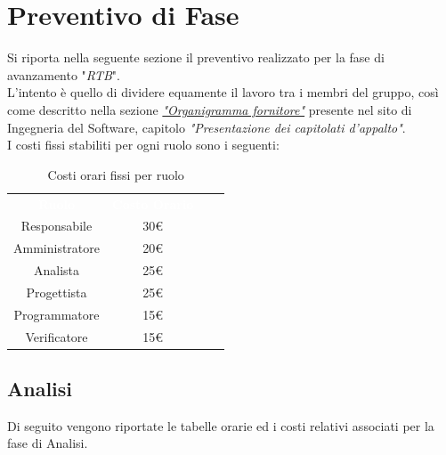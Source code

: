 \section{Preventivo di Fase}
Si riporta nella seguente sezione il preventivo realizzato per la fase
di avanzamento "\textit{RTB}".\\
L'intento è quello di dividere equamente il lavoro tra i membri del gruppo,
così come descritto nella sezione \href{https://www.math.unipd.it/~tullio/IS-1/2021/Progetto/Capitolati.html}{\textit{"Organigramma fornitore"}}
presente nel sito di Ingegneria del Software, capitolo \textit{"Presentazione dei capitolati d'appalto"}.\\

\bigbreak
\noindent
I costi fissi stabiliti per ogni ruolo sono i seguenti:
\begin{table}[htb]
    \centering
    {\renewcommand{\arraystretch}{1.5}
    \begin{tabular}{cccc}
	    \rowcolor[RGB]{33, 73, 50}
	    \textcolor{white}{\textbf{Ruolo}} & \textcolor{white}{\textbf{Costo Orario}}\\
	    \rowcolor[RGB]{216, 235, 171}
	    Responsabile & 30\euro \\
	    \rowcolor[RGB]{233, 245, 206}
	    Amministratore & 20\euro\\
        \rowcolor[RGB]{216, 235, 171}
	    Analista & 25\euro\\
	    \rowcolor[RGB]{233, 245, 206}
	    Progettista & 25\euro\\
        \rowcolor[RGB]{216, 235, 171}
	    Programmatore & 15\euro\\
	    \rowcolor[RGB]{233, 245, 206}
	    Verificatore & 15\euro\\
    \end{tabular}	
}
\caption{Costi orari fissi per ruolo}
\end{table}

\subsection{Analisi}
Di seguito vengono riportate le tabelle orarie ed i costi relativi associati per la fase di Analisi.

\setlength\extrarowheight{5pt}


